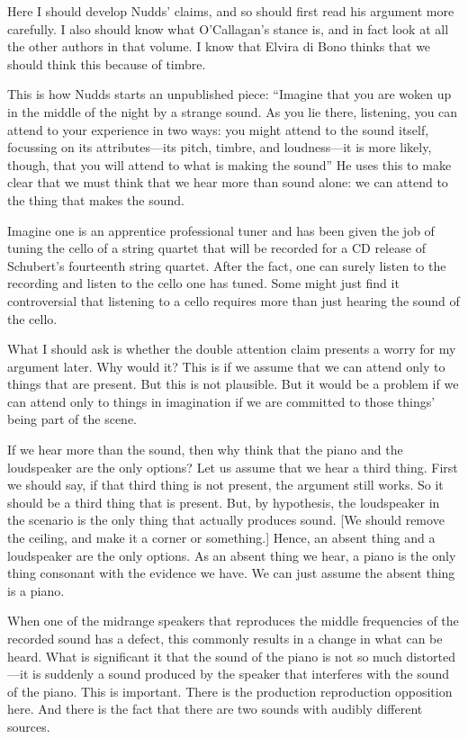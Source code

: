 \documentclass[sloppy, journal, git, bytitle, dodraft]{humapap}
\begin{document}
Here I should develop Nudds' claims, and so should first read his argument more carefully. I also should know what O'Callagan's stance is, and in fact look at all the other authors in that volume. I know that Elvira di Bono thinks that we should think this because of timbre.

This is how Nudds starts an unpublished piece: ``Imagine that you are woken up in the middle of the night by a strange sound. As you lie there, listening, you can attend to your experience in two ways: you might attend to the sound itself, focussing on its attributes---its pitch, timbre, and loudness---it is more likely, though, that you will attend to what is making the sound'' He uses this to make clear that we must think that we hear more than sound alone: we can attend to the thing that makes the sound. 

Imagine one is an apprentice professional tuner and has been given the job of tuning the cello of a string quartet that will be recorded for a CD release of Schubert's fourteenth string quartet. After the fact, one can surely listen to the recording and listen to the cello one has tuned. Some might just find it controversial that listening to a cello requires more than just hearing the sound of the cello.

What I should ask is whether the double attention claim presents a worry for my argument later. Why would it? This is if we assume that we can attend only to things that are present. But this is not plausible. But it would be a problem if we can attend only to things in imagination if we are committed to those things' being part of the scene. 

If we hear more than the sound, then why think that the piano and the loudspeaker are the only options? Let us assume that we hear a third thing. First we should say, if that third thing is not present, the argument still works. So it should be a third thing that is present. But, by hypothesis, the loudspeaker in the scenario is the only thing that actually produces sound. [We should remove the ceiling, and make it a corner or something.] Hence, an absent thing and a loudspeaker are the only options. As an absent thing we hear, a piano is the only thing consonant with the evidence we have. We can just assume the absent thing is a piano. 

When one of the midrange speakers that reproduces the middle frequencies of the recorded sound has a defect, this commonly results in a change in what can be heard. What is significant it that the sound of the piano is not so much distorted---it is suddenly a sound produced by the speaker that interferes with the sound of the piano. This is important. There is the production reproduction opposition here. And there is the fact that there are two sounds with audibly different sources. 
\end{document}
